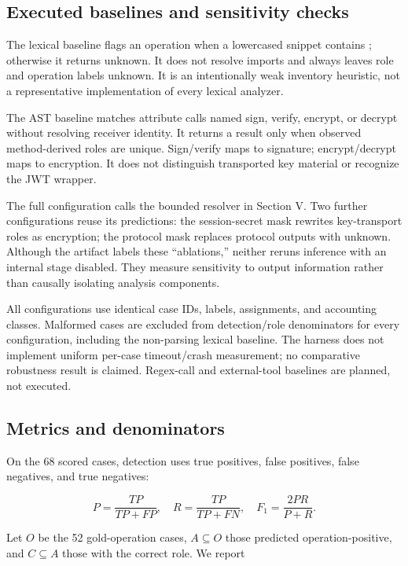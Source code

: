 \documentclass[conference,a4paper]{IEEEtran}
\begin{document}
\subsection{Executed baselines and sensitivity checks}

The lexical baseline flags an operation when a lowercased snippet contains ; otherwise it returns unknown. It does not resolve imports and always leaves role and operation labels unknown. It is an intentionally weak inventory heuristic, not a representative implementation of every lexical analyzer.

The AST baseline matches attribute calls named sign, verify, encrypt, or decrypt without resolving receiver identity. It returns a result only when observed method-derived roles are unique. Sign/verify maps to signature; encrypt/decrypt maps to encryption. It does not distinguish transported key material or recognize the JWT wrapper.

The full configuration calls the bounded resolver in Section V. Two further configurations reuse its predictions: the session-secret mask rewrites key-transport roles as encryption; the protocol mask replaces protocol outputs with unknown. Although the artifact labels these ``ablations,'' neither reruns inference with an internal stage disabled. They measure sensitivity to output information rather than causally isolating analysis components.

All configurations use identical case IDs, labels, assignments, and accounting classes. Malformed cases are excluded from detection/role denominators for every configuration, including the non-parsing lexical baseline. The harness does not implement uniform per-case timeout/crash measurement; no comparative robustness result is claimed. Regex-call and external-tool baselines are planned, not executed.

\subsection{Metrics and denominators}

On the 68 scored cases, detection uses true positives, false positives, false negatives, and true negatives:

\begin{equation}
P=\frac{TP}{TP+FP},\quad R=\frac{TP}{TP+FN},\quad F_1=\frac{2PR}{P+R}.
\end{equation}

Let \(O\) be the 52 gold-operation cases, \(A\subseteq O\) those predicted operation-positive, and \(C\subseteq A\) those with the correct role. We report
\end{document}

